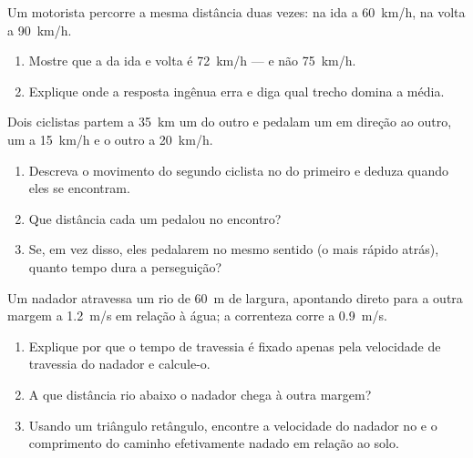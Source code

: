 \begin{exercise}[$\star\star\star$]\label{exo:g10:relative-motion:12}
Um motorista percorre a mesma distância duas vezes: na ida a
\qty{60}{km/h}, na volta a \qty{90}{km/h}.
\begin{enumerate}
  \item Mostre que a  da ida e volta é \qty{72}{km/h}
        --- e não \qty{75}{km/h}.
  \item Explique onde a resposta ingênua erra e diga qual trecho domina a
        média.
\end{enumerate}
\end{exercise}

\begin{exercise}[$\star\star\star$]\label{exo:g10:relative-motion:13}
Dois ciclistas partem a \qty{35}{km} um do outro e pedalam um em direção
ao outro, um a \qty{15}{km/h} e o outro a \qty{20}{km/h}.
\begin{enumerate}
  \item Descreva o movimento do segundo ciclista no  do
        primeiro e deduza quando eles se encontram.
  \item Que distância cada um pedalou no encontro?
  \item Se, em vez disso, eles pedalarem no mesmo sentido (o mais rápido
        atrás), quanto tempo dura a perseguição?
\end{enumerate}
\end{exercise}

\begin{exercise}[$\star\star\star$]\label{exo:g10:relative-motion:14}
Um nadador atravessa um rio de \qty{60}{m} de largura, apontando direto
para a outra margem a \qty{1.2}{m/s} em relação à água; a correnteza
corre a \qty{0.9}{m/s}.
\begin{enumerate}
  \item Explique por que o tempo de travessia é fixado apenas pela
        velocidade de travessia do nadador e calcule-o.
  \item A que distância rio abaixo o nadador chega à outra margem?
  \item Usando um triângulo retângulo, encontre a velocidade do nadador
        no  e o comprimento do caminho efetivamente
        nadado em relação ao solo.
\end{enumerate}
\end{exercise}

